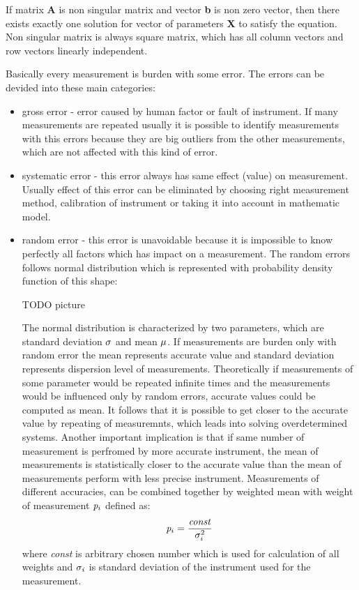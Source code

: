 \documentclass[a4paper,12pt]{article}
\newcommand{\ematr}[1]{
{\bf #1}
}
\newcommand{\evect}[1]{
{\bf #1}
}
\newcommand{\escal}[1]{
{\it #1}
}
\begin{document}

If matrix \ematr{A} is 
non singular matrix  and vector \evect{b} is non zero vector, then there exists exactly one solution 
for vector of parameters  \evect{X} to satisfy the equation. Non singular matrix is always square matrix, 
which has all column vectors and row vectors linearly independent. 


Basically every measurement is burden with some error. The errors can be devided into these main categories:  
\begin{itemize}
\item gross error - error caused by human factor or fault of instrument. If many measurements are repeated
usually it is possible to identify measurements with this errors because they are big outliers from the other measurements, which are not affected with this 
kind of error.
\item systematic error - this error always has same effect (value) on measurement.  Usually effect of this error can be 
eliminated by choosing right measurement method, calibration of instrument or taking it into account in  mathematic model.
\item random error - this error is unavoidable because it is impossible to know perfectly all factors which has impact 
on a measurement. The random errors follows normal distribution which is represented with probability density function of this shape:


TODO picture


The normal distribution is characterized by two parameters, which are standard deviation 
$\escal{\sigma}$ and mean $\escal{\mu}$. 
If measurements are burden only with random error the mean represents accurate value and standard deviation represents 
dispersion level of measurements. 
Theoretically  if measurements of some parameter would be repeated infinite times and the measurements would be influenced only by random errors,
accurate values could be computed as mean.
It follows that it is possible to get closer to the accurate value by repeating of measuremnts, which 
leads into solving overdetermined systems. Another important implication is that if same number of measurement is perfromed by more accurate 
instrument, the mean of measurements is statistically closer to the accurate value than the mean of measurements perform with less precise instrument.
Measurements of different accuracies, can be combined together by weighted mean
with weight of measurement $\escal{p}_{i}$ defined as:
\begin{equation}
\label{eq:wmean}
\escal{p}_{i} = \frac{\escal{const}}{\escal{\sigma}_{i}^{2}}
\end{equation} 
where \escal{const} is arbitrary chosen number which is used for calculation of all weights 
and $\escal{\sigma_{i}}$ is standard deviation of the instrument used for the measurement.
\end{itemize}
\end{document}
